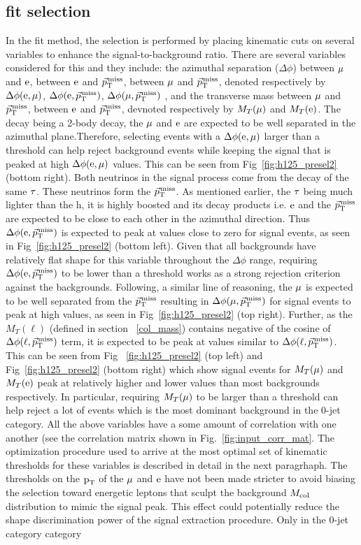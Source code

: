 \subsection{\mcol fit selection}
\label{h125_cb_sel}
In the \mcol fit method, the selection is performed by placing kinematic cuts on several variables to enhance the signal-to-background ratio. There are several variables considered for this and they include: the azimuthal separation ($\Delta\phi$) between $\mu$ and $\text{e}$, between $\text{e}$ and ${\vec p}_{\mathrm{T}}^{\kern1pt\text{miss}}$, between $\mu$ and ${\vec p}_{\mathrm{T}}^{\kern1pt\text{miss}}$, denoted respectively by $\Delta\phi(\text{e}, \mu)$, $\Delta\phi(\text{e}, {\vec p}_{\mathrm{T}}^{\kern1pt\text{miss}})$, $\Delta\phi(\mu, {\vec p}_{\mathrm{T}}^{\kern1pt\text{miss}})$ , and the transverse mass between $\mu$ and ${\vec p}_{\mathrm{T}}^{\kern1pt\text{miss}}$, between $\text{e}$ and ${\vec p}_{\mathrm{T}}^{\kern1pt\text{miss}}$, devnoted respectively by $M_T(\mu)$ and $M_T(\text{e})$. The \hmue decay being a 2-body decay, the $\mu$ and $\text{e}$ are expected to be well separated in the azimuthal plane.Therefore, selecting events with a $\Delta\phi(\text{e}, \mu)$ larger than a threshold can help reject background events while keeping the signal that is peaked at high $\Delta\phi(\text{e}, \mu)$ values. This can be seen from Fig~\ref{fig:h125_presel2} (bottom right). Both neutrinos in the signal process come from the decay of the same $\tau$. These neutrinos form the ${\vec p}_{\mathrm{T}}^{\kern1pt\text{miss}}$. As mentioned earlier, the $\tau$ being much lighter than the h, it is highly boosted and its decay products i.e. $\text{e}$ and the ${\vec p}_{\mathrm{T}}^{\kern1pt\text{miss}}$ are expected to be close to each other in the azimuthal direction. Thus $\Delta\phi(\text{e}, {\vec p}_{\mathrm{T}}^{\kern1pt\text{miss}})$ is expected to peak at values close to zero for signal events, as seen in Fig~\ref{fig:h125_presel2} (bottom left). Given that all backgrounds have relatively flat shape for this variable  throughout the $\Delta\phi$ range, requiring $\Delta\phi(\text{e}, {\vec p}_{\mathrm{T}}^{\kern1pt\text{miss}})$ to be lower than a threshold works as a strong rejection criterion against the backgrounds. Following, a similar line of reasoning, the $\mu$ is expected to be well separated from the ${\vec p}_{\mathrm{T}}^{\kern1pt\text{miss}}$ resulting in $\Delta\phi(\mu, {\vec p}_{\mathrm{T}}^{\kern1pt\text{miss}})$ for signal events to peak at high values, as seen in Fig~\ref{fig:h125_presel2} (top right). Further, as the $M_T(\ell)$ (defined in section ~\ref{col_mass}) contains negative of the cosine of $\Delta\phi(\ell, {\vec p}_{\mathrm{T}}^{\kern1pt\text{miss}})$ term, it is expected to be peak at values similar to $\Delta\phi(\ell, {\vec p}_{\mathrm{T}}^{\kern1pt\text{miss}})$. This can be seen from Fig ~\ref{fig:h125_presel2} (top left) and Fig~\ref{fig:h125_presel2} (bottom right) which show signal events for $M_T(\mu)$ and $M_T(\text{e})$ peak at relatively higher and lower values than most backgrounds respectively. In particular, requiring $M_T(\mu)$ to be larger than a threshold can help reject a lot of \ztt events which is the most dominant background in the 0-jet category. All the above variables have a some amount of correlation with one another (see the correlation matrix shown in Fig.~\ref{fig:input_corr_mat}. The optimization procedure used to arrive at the most optimal set of kinematic thresholds for these variables is described in detail in the next paragrhaph. The thresholds on the $\text{p}_\text{T}$ of the $\mu$ and $\text{e}$ have not been made stricter to avoid biasing the selection toward energetic leptons that sculpt the background $M_{\text{col}}$ distribution to mimic the signal peak. This effect could potentially reduce the shape discrimination power of the signal extraction procedure. Only in the 0-jet category category 